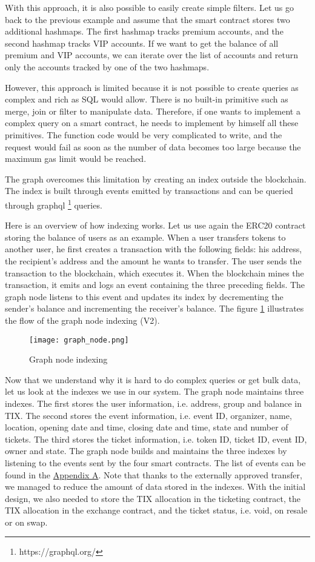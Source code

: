 \documentclass[a4paper,11pt,oneside]{report}
\begin{document}
With this approach, it is also possible to easily create simple filters. Let us go back to the previous example and assume that the smart contract stores two additional hashmaps. The first hashmap tracks premium accounts, and the second hashmap tracks VIP accounts. If we want to get the balance of all premium and VIP accounts, we can iterate over the list of accounts and return only the accounts tracked by one of the two hashmaps.

However, this approach is limited because it is not possible to create queries as complex and rich as SQL would allow. There is no built-in primitive such as merge, join or filter to manipulate data. Therefore, if one wants to implement a complex query on a smart contract, he needs to implement by himself all these primitives. The function code would be very complicated to write, and the request would fail as soon as the number of data becomes too large because the maximum gas limit would be reached.

The graph overcomes this limitation by creating an index outside the blockchain. The index is built through events emitted by transactions and can be queried through graphql \footnote{https://graphql.org/} queries.

Here is an overview of how indexing works. Let us use again the ERC20 contract storing the balance of users as an example. When a user transfers tokens to another user, he first creates a transaction with the following fields: his address, the recipient's address and the amount he wants to transfer. The user sends the transaction to the blockchain, which executes it. When the blockchain mines the transaction, it emits and logs an event containing the three preceding fields. The graph node listens to this event and updates its index by decrementing the sender's balance and incrementing the receiver's balance. The figure \hyperref[fig:graph_node]{\ref{fig:graph_node}} illustrates the flow of the graph node indexing (V2).

\begin{figure}[h!] 
  \centering
  \texttt{[image: graph\_node.png]}
  \caption{Graph node indexing}
  \label{fig:graph_node}
\end{figure}

Now that we understand why it is hard to do complex queries or get bulk data, let us look at the indexes we use in our system. The graph node maintains three indexes. The first stores the user information, i.e. address, group and balance in TIX. The second stores the event information, i.e. event ID, organizer, name, location, opening date and time, closing date and time, state and number of tickets. The third stores the ticket information, i.e. token ID, ticket ID, event ID, owner and state. The graph node builds and maintains the three indexes by listening to the events sent by the four smart contracts. The list of events can be found in the \hyperref[sec:appendix_a]{Appendix A}. Note that thanks to the externally approved transfer, we managed to reduce the amount of data stored in the indexes. With the initial design, we also needed to store the TIX allocation in the ticketing contract, the TIX allocation in the exchange contract, and the ticket status, i.e. void, on resale or on swap.
\end{document}

